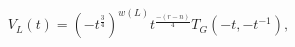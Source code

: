 \begin{equation}
V_{L}(t)=(-t^{\frac{3}{4}})^{w(L)}t^{\frac{-(r-n)}{4}}T_{\mathit{G}%
}(-t,-t^{-1}),  \label{37}
\end{equation}


